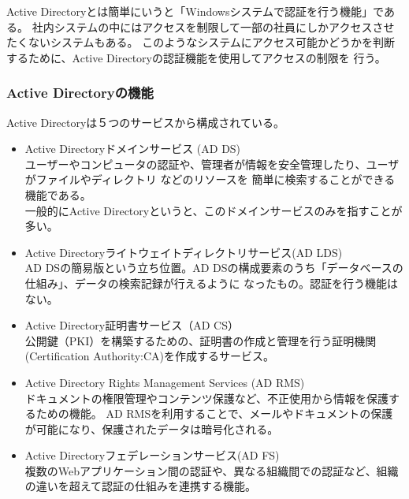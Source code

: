 \documentclass[12pt,a4paper,titlepage]{jsarticle}
\begin{document}
Active Directoryとは簡単にいうと「Windowsシステムで認証を行う機能」である。
社内システムの中にはアクセスを制限して一部の社員にしかアクセスさせたくないシステムもある。
このようなシステムにアクセス可能かどうかを判断するために、Active Directoryの認証機能を使用してアクセスの制限を
行う。

\subsubsection*{Active Directoryの機能}

Active Directoryは５つのサービスから構成されている。

\begin{itemize}
    \item  Active Directoryドメインサービス (AD DS)\mbox{}\\
    ユーザーやコンピュータの認証や、管理者が情報を安全管理したり、ユーザがファイルやディレクトリ などのリソースを
    簡単に検索することができる機能である。\\
    一般的にActive Directoryというと、このドメインサービスのみを指すことが多い。
    
    \item Active Directoryライトウェイトディレクトリサービス(AD LDS)\mbox{}\\
    AD DSの簡易版という立ち位置。AD DSの構成要素のうち「データベースの仕組み」、データの検索記録が行えるように
    なったもの。認証を行う機能はない。

    \item Active Directory証明書サービス（AD CS）\mbox{}\\
    公開鍵（PKI）を構築するための、証明書の作成と管理を行う証明機関(Certification Authority:CA)を作成するサービス。
    
    \item Active Directory Rights Management Services (AD RMS)\mbox{}\\
    ドキュメントの権限管理やコンテンツ保護など、不正使用から情報を保護するための機能。
    AD RMSを利用することで、メールやドキュメントの保護が可能になり、保護されたデータは暗号化される。

    \item Active Directoryフェデレーションサービス(AD FS)\mbox{}\\
    複数のWebアプリケーション間の認証や、異なる組織間での認証など、組織の違いを超えて認証の仕組みを連携する機能。


\end{itemize}
\end{document}
